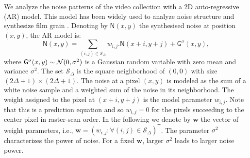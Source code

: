 \documentclass{sig-alternate}
\newcommand{\vect}[1]{\boldsymbol{#1}} %
\begin{document}
We analyze the noise patterns of the video collection with a 2D auto-regressive (AR) model. This model has been widely used to analyze noise structure and synthesize film grain \cite{DeStefano2006,ColRobWhi2004}. Denoting by $\mathsf{N}(x,y)$ the synthesised noise at position $(x,y)$, the AR model is:
\begin{equation}
\label{eq:ar_noise_model}
\mathsf{N}(x,y) = \sum\limits_{(i,j) \in \mathcal{S}_\Delta} {w_{i,j}.\mathsf{N}(x+i,y+j)}+\mathsf{G}^{\sigma}(x,y),
\end{equation}
where $\mathsf{G}^{\sigma}(x,y) \sim {\cal N}(0,\sigma^2)$ is
a Gaussian random variable with zero mean and variance $\sigma^2$. The set $\mathcal{S}_\Delta$ is the square neighborhood of $(0,0)$ with size $(2\Delta + 1)\times(2\Delta + 1)$. The noise at a pixel $(x,y)$ is modeled as the sum of a white noise sample and a weighted sum of the noise in its neighborhood. The weight assigned to the pixel at $(x+i,y+j)$ is the model parameter $w_{i,j}$. Note that this is a prediction equation and so $w_{i,j} = 0$ for the pixels succeeding to the center pixel in raster-scan order. In the following we denote by $\vect{w}$ the vector of weight parameters, i.e., $\vect{w} = \left(w_{i,j}: \forall (i,j)\in\mathcal{S}_\Delta\right)^\mathsf{T}$. The parameter $\sigma^2$ characterizes the power of noise. For a fixed $\vect{w}$, larger $\sigma^2$ leads to larger noise power.
\end{document}
